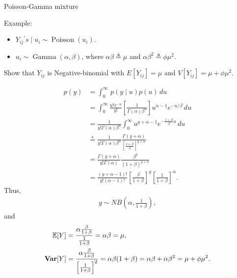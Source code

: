 \documentclass[UTF8,a4paper,10pt]{article}
\begin{document}

\begin{Problem}[]{Poisson-Gamma mixture}

  Example:
  \begin{itemize}
    \item $Y_{i j}{ }^{\prime} s \mid u_i{ }\sim \operatorname{Poisson}\left(u_i\right).$
    \item  $u_i \sim \operatorname{Gamma}(\alpha, \beta)$, where $\alpha \beta \triangleq \mu$ and $\alpha \beta^2 \triangleq \phi \mu^2$.
  \end{itemize}

  
Show that $Y_{i j}$ is Negative-binomial with $E\left[Y_{i j}\right]=\mu$ and $V\left[Y_{i j}\right]=\mu+\phi \mu^2$.
\end{Problem}
\begin{align*}
  p(y) &= \int_{0}^{\infty}\, p(y\mid u)p(u)\,du\\
  & = \int_{0}^{\infty} \frac{u^{y}e^{-u}}{y!}\left[\frac{1}{\Gamma(\alpha)\beta^{\alpha}}\right]u^{\alpha-1}e^{-u/\beta}\,du\\
  & =  \frac{1}{y!\Gamma(\alpha)\beta^{\alpha}} \int_{0}^{\infty}u^{y+\alpha-1}e^{-\frac{1+\beta}{\beta}u}\,du\\
  & \overset{*}{=}  \frac{1}{y!\Gamma(\alpha)\beta^{\alpha}}\frac{\Gamma(y+\alpha)}{\left[\frac{1+\beta}{\beta}\right]^{y+\alpha}}\\
  & = \frac{\Gamma(y+\alpha)}{y!\Gamma(\alpha)}\frac{\beta^y}{(1+\beta)^{y+\alpha}}\\
  & = \frac{(y+\alpha-1)!}{y!(\alpha-1)!}\left[\frac{\beta}{1+\beta}\right]^{y}\left[\frac{1}{1+\beta}\right]^{\alpha}.
\end{align*}
Thus,
\begin{align*}
  y\sim   NB(\alpha,\frac{1}{1+\beta}),
\end{align*}
and
\begin{align*}
  \operatorname{\mathbb{E}}[Y] &= \frac{\alpha\frac{\beta}{1+\beta}}{\frac{1}{1+\beta}} = \alpha\beta = \mu,\\
  \operatorname{\textbf{Var}}[Y] & = \frac{\alpha\frac{\beta}{1+\beta}}{\left[\frac{1}{1+\beta}\right]^2} = \alpha\beta(1+\beta) = \alpha\beta+\alpha\beta^2 = \mu +\phi \mu^2.
\end{align*}
\end{document}
